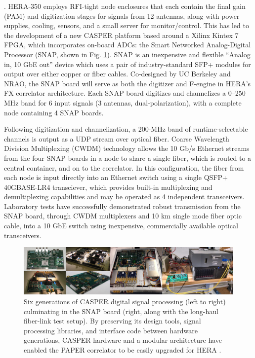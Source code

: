 \documentclass[preprint,11pt]{aastex}
\newcommand{\Mycitep}[1]{\citep{#1}}
\begin{document}
\vspace{.2in}
. 
HERA-350 employs RFI-tight node enclosures that each contain the final gain (PAM) and digitization stages for signals from 12 antennas, along with power supplies, cooling, sensors, and a small server for monitor/control. 
This has led to the development of a new CASPER platform based around a Xilinx Kintex 7 FPGA, which incorporates on-board ADCs: the Smart Networked Analog-Digital Processor (SNAP, shown in Fig. \ref{fig:hardware}).
SNAP is an inexpensive and flexible ``Analog in, 10 GbE out'' device which uses a pair of industry-standard SFP+ modules for output over either copper or fiber cables.
Co-designed by UC Berkeley and NRAO, the SNAP board will serve as both the digitizer and F-engine in HERA's FX correlator architecture.
Each SNAP board digitizes and channelizes a 0--250 MHz band for 6 input signals (3 antennas, dual-polarization), with a complete node containing 4 SNAP boards.

Following digitization and channelization, a 200-MHz band of runtime-selectable channels is output as a UDP stream over optical fiber.
Coarse Wavelength Division Multiplexing (CWDM) technology allows the 10 Gb/s Ethernet streams from the four SNAP boards in a node to share a single fiber, which is routed to a central container, and on to the correlator.
In this configuration, the fiber from each node is input directly into an Ethernet switch using a single QSFP+ 40GBASE-LR4 transciever, which provides built-in multiplexing and demultiplexing capabilities and may be operated as 4 independent transceivers.
Laboratory tests have successfully demonstrated robust transmission from the SNAP board, through CWDM multiplexers and 10 km single mode fiber optic cable, into a 10 GbE switch using inexpensive, commercially available optical transceivers.

\begin{figure}[h]
\centering
\includegraphics[width=1.0\textwidth]{plots/casper_boards.png}
\caption{
Six generations of CASPER digital signal processing (left to right) culminating in the SNAP board (right, along with the long-haul fiber-link test setup).
By preserving its design tools, signal processing libraries, and interface code between hardware generations, CASPER hardware and a modular architecture have enabled the PAPER correlator to be easily upgraded for HERA \Mycitep{parsons_et_al2006,parsons_et_al2008}.
%
}\label{fig:hardware}
\end{figure}
\end{document}
